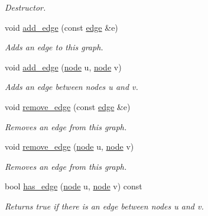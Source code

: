 \begin{DoxyCompactItemize}
\begin{DoxyCompactList}\small\item\em Destructor. \end{DoxyCompactList}\item 
void \hyperlink{classlgraph_1_1utils_1_1uugraph_ad1e6036f836c981ab8f4b540cbaa817e}{add\+\_\+edge} (const \hyperlink{namespacelgraph_1_1utils_a6510284ce1b1ae5dc97ce5d2de426e10}{edge} \&e)
\begin{DoxyCompactList}\small\item\em Adds an edge to this graph. \end{DoxyCompactList}\item 
void \hyperlink{classlgraph_1_1utils_1_1uugraph_a3729660ecdd5d7ed338f0cd687403cbf}{add\+\_\+edge} (\hyperlink{namespacelgraph_1_1utils_a7bd66ede3805ef121bc2835bd48de0cf}{node} u, \hyperlink{namespacelgraph_1_1utils_a7bd66ede3805ef121bc2835bd48de0cf}{node} v)
\begin{DoxyCompactList}\small\item\em Adds an edge between nodes {\itshape u} and {\itshape v}. \end{DoxyCompactList}\item 
void \hyperlink{classlgraph_1_1utils_1_1uugraph_a12591fd958878113b373040b4c164f14}{remove\+\_\+edge} (const \hyperlink{namespacelgraph_1_1utils_a6510284ce1b1ae5dc97ce5d2de426e10}{edge} \&e)
\begin{DoxyCompactList}\small\item\em Removes an edge from this graph. \end{DoxyCompactList}\item 
void \hyperlink{classlgraph_1_1utils_1_1uugraph_ae564207e9c3887aa6be115bce28c66b8}{remove\+\_\+edge} (\hyperlink{namespacelgraph_1_1utils_a7bd66ede3805ef121bc2835bd48de0cf}{node} u, \hyperlink{namespacelgraph_1_1utils_a7bd66ede3805ef121bc2835bd48de0cf}{node} v)
\begin{DoxyCompactList}\small\item\em Removes an edge from this graph. \end{DoxyCompactList}\item 
bool \hyperlink{classlgraph_1_1utils_1_1uugraph_a1970a2f371f20284478246a83292f9bb}{has\+\_\+edge} (\hyperlink{namespacelgraph_1_1utils_a7bd66ede3805ef121bc2835bd48de0cf}{node} u, \hyperlink{namespacelgraph_1_1utils_a7bd66ede3805ef121bc2835bd48de0cf}{node} v) const 
\begin{DoxyCompactList}\small\item\em Returns true if there is an edge between nodes {\itshape u} and {\itshape v}. \end{DoxyCompactList}\item 

\end{DoxyCompactItemize}
